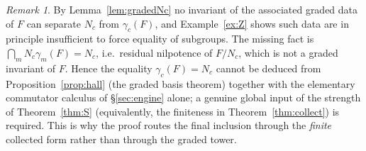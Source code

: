 \documentclass{amsart}
\theoremstyle{definition}
\theoremstyle{remark}
\newtheorem{remark}{Remark}
\begin{document}
\begin{remark}\label{rem:graded-insufficient}
By Lemma~\ref{lem:gradedNc} no invariant of the associated graded data of $F$ can
separate $N_c$ from $\gamma_c(F)$, and Example~\ref{ex:Z} shows such data are in
principle insufficient to force equality of subgroups. The missing fact is
$\bigcap_m N_c\gamma_m(F)=N_c$, i.e.\ residual nilpotence of $F/N_c$, which is not a
graded invariant of $F$. Hence the equality $\gamma_c(F)=N_c$ cannot be deduced from
Proposition~\ref{prop:hall} (the graded basis theorem) together with the elementary
commutator calculus of \S\ref{sec:engine} alone; a genuine global input of the
strength of Theorem~\ref{thm:S} (equivalently, the finiteness in
Theorem~\ref{thm:collect}) is required. This is why the proof routes the final
inclusion through the \emph{finite} collected form rather than through the graded
tower.
\end{remark}
\end{document}
